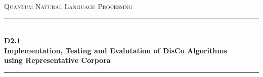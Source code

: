 \documentclass[11pt]{article}
\begin{document}
\begin{titlepage}
\newcommand{\HRule}{\rule{\linewidth}{0.1mm}} 
\center %
 
\vfill
\textsc{\LARGE Quantum Natural Language Processing}
\vfill
\HRule \\[0.4cm]
{ \Large \bfseries D2.1} \\[0.3cm]
{ \Large \bfseries Implementation, Testing and Evalutation of DisCo Algorithms \\[0.1cm]using Representative Corpora}\\[0.1cm]
\HRule \\[1.5cm]
 

\end{titlepage}
\end{document}
